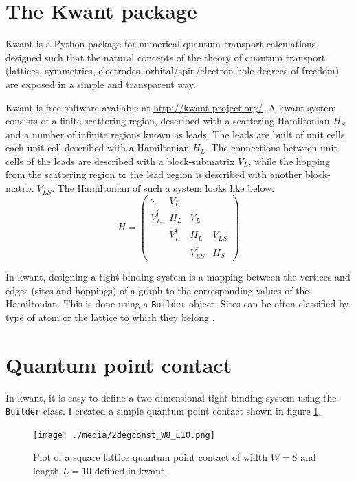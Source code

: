 \documentclass[11pt, a4paper, twocolumn]{article}
\begin{document}
\section*{The Kwant package}
Kwant is a Python package for numerical quantum transport calculations \cite{kwant-paper} 
designed such that the natural concepts of the theory of quantum transport (lattices, symmetries,
electrodes, orbital/spin/electron-hole degrees of freedom) are exposed in a simple and transparent way.

Kwant is free software available at \url{http://kwant-project.org/}. A kwant system consists of a finite scattering region,
described with a scattering Hamiltonian $H_S$ and a number of infinite regions known as leads.
The leads are built of unit cells, each unit cell described with a Hamiltonian $H_L$. The connections
between unit cells of the leads are described with a block-submatrix $V_L$, while the hopping from the scattering region
to the lead region is described with another block-matrix $V_{LS}$. The Hamiltonian of such a system looks like below:
\begin{equation*}
  H = \left(
    \begin{array}{cccc}
      \ddots     & V_L        &                  &        \\
      V_L^{\dag} & H_L        & V_L              &        \\
                 & V_L^{\dag} & H_L              &  V_{LS}\\
                 &            & V_{LS}^{\dag}    & H_S
    \end{array}
  \right)
\end{equation*}

\par In kwant, designing a tight-binding system is a mapping between the vertices and edges (sites and hoppings) of
a graph to the corresponding values of the Hamiltonian. This is done using a \texttt{Builder} object. Sites can
be often classified by type of atom or the lattice to which they belong \cite{kwant-paper}.

\section*{Quantum point contact}

In kwant, it is easy to define a two-dimensional tight binding system using the \texttt{Builder} class.
I created a simple quantum point contact shown in figure \ref{fig:2degconst_W8_L10.png}.
\begin{figure}[H]
  \begin{center}
  \texttt{[image: ./media/2degconst\_W8\_L10.png]}
  \caption{Plot of a square lattice quantum point contact of width $W=8$ and
  length $L=10$ defined in kwant.}
  \label{fig:2degconst_W8_L10.png}
  \end{center}
\end{figure}
\end{document}
